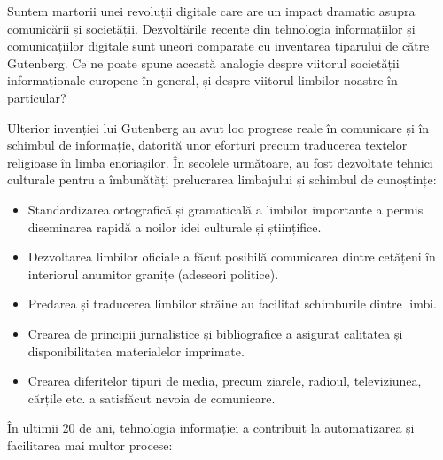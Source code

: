 \begin{multicols}{2}
Suntem martorii unei revoluții digitale care are un impact dramatic asupra comunicării și societății. Dezvoltările recente din tehnologia informațiilor și comunicațiilor digitale sunt uneori comparate cu inventarea tiparului de către Gutenberg. Ce ne poate spune această analogie despre viitorul societății informaționale europene în general, și despre viitorul limbilor noastre în particular?


Ulterior invenției lui Gutenberg au avut loc progrese reale în comunicare și în schimbul de informație, datorită unor eforturi precum traducerea textelor religioase în limba enoriașilor. În secolele următoare, au fost dezvoltate tehnici culturale pentru a îmbunătăți prelucrarea limbajului și schimbul de cunoștințe:

\medskip
\begin{itemize}
\item Standardizarea ortografică și gramaticală a limbilor importante a permis diseminarea rapidă a noilor idei culturale și științifice.
\item Dezvoltarea limbilor oficiale a făcut posibilă comunicarea dintre cetățeni în interiorul anumitor granițe (adeseori politice).
\item Predarea și traducerea limbilor străine au facilitat schimburile dintre limbi.
\item Crearea de principii jurnalistice și bibliografice a asigurat calitatea și disponibilitatea materialelor imprimate.
\medskip
\item Crearea diferitelor tipuri de media, precum ziarele, radioul, televiziunea, cărțile etc. a satisfăcut nevoia de comunicare.
\end{itemize}

În ultimii 20 de ani, tehnologia informației a contribuit la automatizarea și facilitarea mai multor procese:


\end{multicols}
